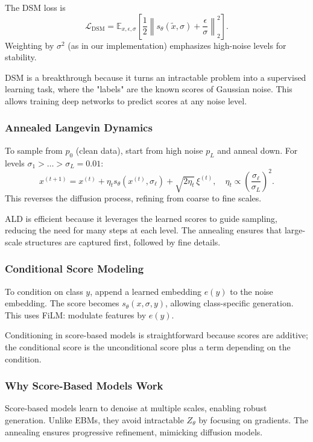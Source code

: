 \documentclass[a4paper,12pt]{article}
\begin{document}
The DSM loss is
\begin{equation}
    \mathcal{L}_{\text{DSM}} = \mathbb{E}_{x, \epsilon, \sigma} \left[ \frac{1}{2} \left\| s_\theta(\tilde{x}, \sigma) + \frac{\epsilon}{\sigma} \right\|_2^2 \right].
\end{equation}
Weighting by $\sigma^2$ (as in our implementation) emphasizes high-noise levels for stability.

DSM is a breakthrough because it turns an intractable problem into a supervised learning task, where the "labels" are the known scores of Gaussian noise. This allows training deep networks to predict scores at any noise level.

\subsubsection{Annealed Langevin Dynamics}
To sample from $p_0$ (clean data), start from high noise $p_{L}$ and anneal down. For levels $\sigma_1 > \dots > \sigma_L = 0.01$:
\begin{equation}
    x^{(t+1)} = x^{(t)} + \eta_t s_\theta(x^{(t)}, \sigma_\ell) + \sqrt{2\eta_t} \, \xi^{(t)}, \quad \eta_t \propto \left(\frac{\sigma_\ell}{\sigma_L}\right)^2.
\end{equation}
This reverses the diffusion process, refining from coarse to fine scales.

ALD is efficient because it leverages the learned scores to guide sampling, reducing the need for many steps at each level. The annealing ensures that large-scale structures are captured first, followed by fine details.

\subsubsection{Conditional Score Modeling}
To condition on class $y$, append a learned embedding $e(y)$ to the noise embedding. The score becomes $s_\theta(x, \sigma, y)$, allowing class-specific generation. This uses FiLM: modulate features by $e(y)$.

Conditioning in score-based models is straightforward because scores are additive; the conditional score is the unconditional score plus a term depending on the condition.

\subsubsection{Why Score-Based Models Work}
Score-based models learn to denoise at multiple scales, enabling robust generation. Unlike EBMs, they avoid intractable $Z_\theta$ by focusing on gradients. The annealing ensures progressive refinement, mimicking diffusion models.
\end{document}
